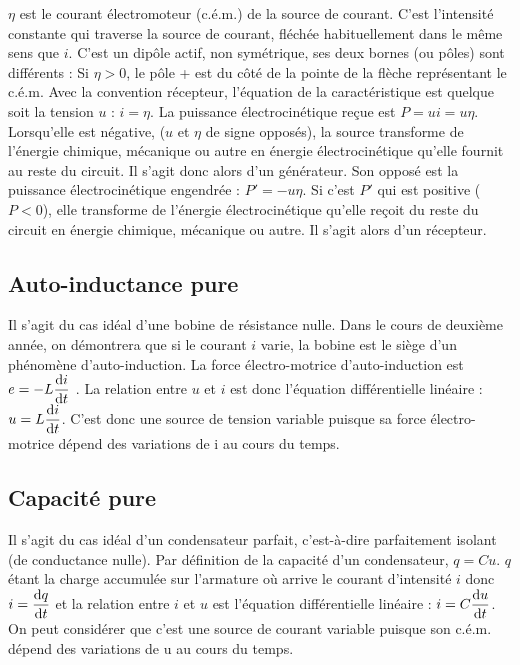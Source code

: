 \(\eta\) est le courant électromoteur (c.é.m.) de la source de courant. C'est l'intensité constante qui traverse la source de courant, fléchée habituellement dans le même sens que \(i\).
C'est un dipôle actif, non symétrique, ses deux bornes (ou pôles) sont différents : Si \(\eta > 0\), le pôle + est du côté de la pointe de la flèche représentant le c.é.m. Avec la convention récepteur, l'équation de la caractéristique est quelque soit la tension \(u\) : \(i=\eta\). La puissance électrocinétique reçue est \(P  = u i = u \eta\). Lorsqu'elle est négative, (\(u\) et \(\eta\) de signe opposés), la source transforme de l'énergie chimique, mécanique ou autre en énergie électrocinétique qu'elle fournit au reste du circuit. Il s'agit donc alors d'un générateur. Son opposé est la puissance électrocinétique engendrée : \(P' = -u\eta\). Si c'est \(P'\) qui est positive (\(P  < 0\)), elle transforme de l'énergie électrocinétique qu'elle reçoit du reste du circuit en énergie chimique, mécanique ou autre. Il s'agit alors d'un récepteur.

\subsection{Auto-inductance pure}

Il s'agit du cas idéal d'une bobine de résistance nulle. Dans le cours de deuxième année, on démontrera que si le courant \(i\) varie, la bobine est le siège d'un phénomène d'auto-induction. La force électro-motrice d'auto-induction est \(e = -L\dfrac{\mathrm{d} i}{\mathrm{d} t}\) . La relation entre \(u\) et \(i\) est donc l'équation différentielle linéaire : \(u = L\dfrac{\mathrm{d} i}{\mathrm{d} t}\). C'est donc une source de tension variable puisque sa force électro-motrice dépend des variations de i au cours du temps.

\subsection{Capacité pure}

Il s'agit du cas idéal d'un condensateur parfait, c'est-à-dire parfaitement isolant (de conductance nulle). Par définition de la capacité d'un condensateur, \(q=Cu\). \(q\) étant la charge accumulée sur l'armature où arrive le courant d'intensité \(i\) donc \(i = \dfrac{\mathrm{d} q}{\mathrm{d} t}\)  et la relation entre \(i\) et \(u\) est l'équation différentielle linéaire : \(i=C\dfrac{\mathrm{d} u}{\mathrm{d} t}\). On peut considérer que c'est une source de courant variable puisque son c.é.m. dépend des variations de u au cours du temps.

